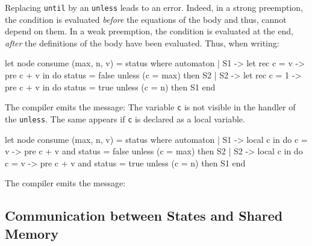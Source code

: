 \documentclass[11pt,titlepage,twoside]{report}
\makeatletter
\newenvironment{sample}
  {\@open{div}{\envclass@attr{zelusprompt}}
   \begin{alltt}}
  {\end{alltt}\@close{div}}
\newenvironment{sample}
  {\begin{flushright}\begin{minipage}[t]{15.3cm}\begin{alltt}\small}
  {\end{alltt}\end{minipage}\end{flushright}}
\makeatother
\begin{document}
Replacing \verb-until- by an \verb-unless- leads to an error. Indeed,
in a strong preemption, the condition is evaluated {\em before} the
equations of the body and thus, cannot depend on them. In a weak
preemption, the condition is evaluated at the end, {\em after} the
definitions of the body have been evaluated. Thus, when writing:
\begin{chklisting}[fail]
let node consume (max, n, v) = status where
  automaton
  | S1 ->
      let rec c = v -> pre c + v in
      do status = false
      unless (c = max) then S2
  | S2 ->
      let rec c = 1 -> pre c + v in
      do status = true
      unless (c = n) then S1
  end
\end{chklisting}
The compiler emits the message:
\chklistingerr{}
The variable \verb-c- is not visible in the handler of the \verb-unless-. The
same appears if \verb-c- is declared as a local variable.
\begin{chklisting}[fail]
let node consume (max, n, v) = status where
  automaton
  | S1 ->
      local c in
      do c = v -> pre c + v and status = false
      unless (c = max) then S2
  | S2 ->
      local c in
      do c = v -> pre c + v and status = true
      unless (c = n) then S1
  end
\end{chklisting}
The compiler emits the message:
\chklistingerr{}

\subsection{Communication between States and Shared Memory\label{commstateshared}} %
\end{document}
